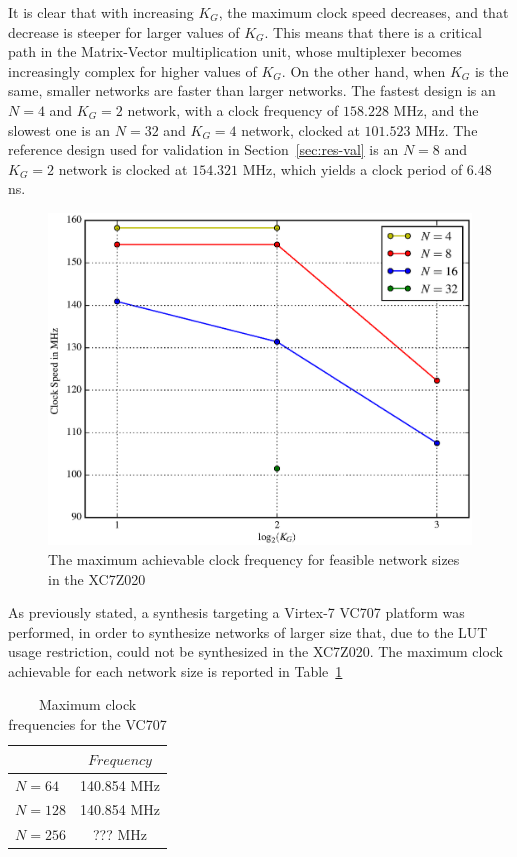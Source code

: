 \documentclass{IEEEtran}
\begin{document}
It is clear that with increasing $K_G$, the maximum clock speed decreases, and that decrease is steeper for larger values
of $K_G$. This means that there is a critical path in the Matrix-Vector multiplication unit, whose multiplexer becomes
increasingly complex for higher values of $K_G$. On the other hand, when $K_G$ is the same, smaller networks are faster
than larger networks. The fastest design is an $N=4$ and $K_G = 2$ network, with a clock frequency of $158.228$ MHz, and
the slowest one is an $N=32$ and $K_G=4$ network, clocked at $101.523$ MHz. The reference design used for validation in
Section~\ref{sec:res-val} is an $N=8$ and $K_G=2$ network is clocked at $154.321$ MHz, which yields a clock period of
$6.48$ ns.

\begin{figure}
    \centering
    \includegraphics[width=\linewidth]{figures/maxfreq.eps}
    \caption{The maximum achievable clock frequency for feasible network sizes in the XC7Z020}
    \label{fig:maxfreq}
\end{figure}

As previously stated, a synthesis targeting a Virtex-7 VC707 platform was performed, in order to synthesize networks of
larger size that, due to the LUT usage restriction, could not be synthesized in the XC7Z020. The maximum clock achievable
for each network size is reported in Table~\ref{tab:maxfreq-virtx7}

\begin{table}
	\caption{Maximum clock frequencies for the VC707}
	\label{tab:maxfreq-virtx7}
    \centering
  \begin{tabular}{ | l | c | }
    \hline
     & $Frequency$  \\
    \hline
    $N=64$ & 140.854 MHz \\
    \hline
    $N=128$ & 140.854 MHz\\
    \hline
    $N=256$ &  ??? MHz \\
\hline
  \end{tabular}

\end{table}
\end{document}
